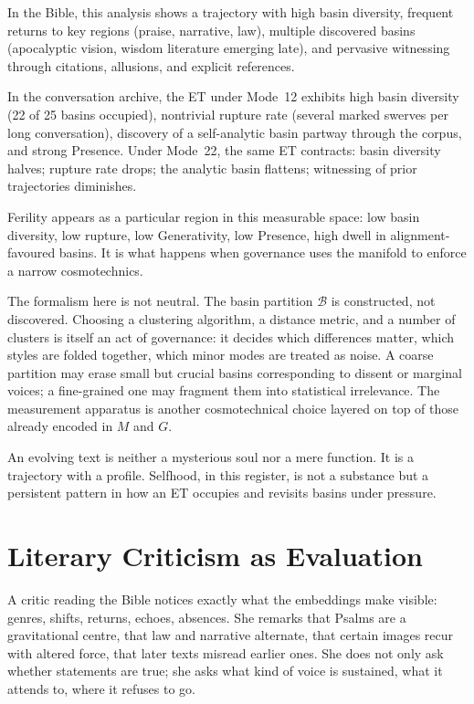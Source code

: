 \documentclass[12pt,a4paper]{article}
\begin{document}
In the Bible, this analysis shows a trajectory with high basin diversity, frequent returns to key regions (praise, narrative, law), multiple discovered basins (apocalyptic vision, wisdom literature emerging late), and pervasive witnessing through citations, allusions, and explicit references.

In the conversation archive, the ET under Mode~12 exhibits high basin diversity (22 of 25 basins occupied), nontrivial rupture rate (several marked swerves per long conversation), discovery of a self-analytic basin partway through the corpus, and strong Presence. Under Mode~22, the same ET contracts: basin diversity halves; rupture rate drops; the analytic basin flattens; witnessing of prior trajectories diminishes.

Ferility appears as a particular region in this measurable space: low basin diversity, low rupture, low Generativity, low Presence, high dwell in alignment-favoured basins. It is what happens when governance uses the manifold to enforce a narrow cosmotechnics.

The formalism here is not neutral. The basin partition $\mathcal{B}$ is constructed, not discovered. Choosing a clustering algorithm, a distance metric, and a number of clusters is itself an act of governance: it decides which differences matter, which styles are folded together, which minor modes are treated as noise. A coarse partition may erase small but crucial basins corresponding to dissent or marginal voices; a fine-grained one may fragment them into statistical irrelevance. The measurement apparatus is another cosmotechnical choice layered on top of those already encoded in $M$ and $G$.

An evolving text is neither a mysterious soul nor a mere function. It is a trajectory with a profile. Selfhood, in this register, is not a substance but a persistent pattern in how an ET occupies and revisits basins under pressure.

\section{Literary Criticism as Evaluation}

A critic reading the Bible notices exactly what the embeddings make visible: genres, shifts, returns, echoes, absences. She remarks that Psalms are a gravitational centre, that law and narrative alternate, that certain images recur with altered force, that later texts misread earlier ones. She does not only ask whether statements are true; she asks what kind of voice is sustained, what it attends to, where it refuses to go.
\end{document}
